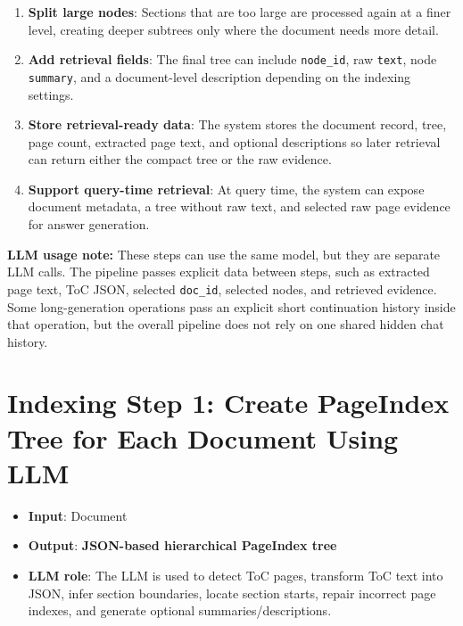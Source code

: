 \documentclass[11pt,a4paper]{article}
\newcommand{\fieldname}[1]{\textcolor{red!70!black}{\texttt{#1}}}
\begin{document}
\begin{enumerate}
    \item \textbf{Split large nodes}: Sections that are too large are processed again at a finer level, creating deeper subtrees only where the document needs more detail.
    \item \textbf{Add retrieval fields}: The final tree can include \fieldname{node\_id}, raw \fieldname{text}, node \fieldname{summary}, and a document-level description depending on the indexing settings.
    \item \textbf{Store retrieval-ready data}: The system stores the document record, tree, page count, extracted page text, and optional descriptions so later retrieval can return either the compact tree or the raw evidence.
    \item \textbf{Support query-time retrieval}: At query time, the system can expose document metadata, a tree without raw text, and selected raw page evidence for answer generation.
\end{enumerate}

\noindent\textbf{LLM usage note:} These steps can use the same model, but they are separate LLM calls. The pipeline passes explicit data between steps, such as extracted page text, ToC JSON, selected \fieldname{doc\_id}, selected nodes, and retrieved evidence. Some long-generation operations pass an explicit short continuation history inside that operation, but the overall pipeline does not rely on one shared hidden chat history.

\newpage
\section{Indexing Step 1: Create PageIndex Tree for Each Document Using LLM}
\begin{itemize}
    \item \textbf{Input}: Document
    \item \textbf{Output}: \textbf{JSON-based hierarchical PageIndex tree}
    \item \textbf{LLM role}: The LLM is used to detect ToC pages, transform ToC text into JSON, infer section boundaries, locate section starts, repair incorrect page indexes, and generate optional summaries/descriptions.
\end{itemize}
\end{document}
